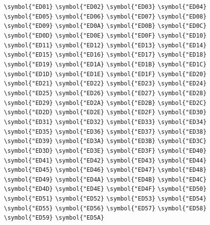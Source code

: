 \documentclass{ctexbook}
\begin{document}
{\verb|\symbol{"ED01}|  \verb|\symbol{"ED02}|  \verb|\symbol{"ED03}|  \verb|\symbol{"ED04}|  \verb|\symbol{"ED05}|  \verb|\symbol{"ED06}|  \verb|\symbol{"ED07}|  \verb|\symbol{"ED08}|  \verb|\symbol{"ED09}|  \verb|\symbol{"ED0A}|  \verb|\symbol{"ED0B}|  \verb|\symbol{"ED0C}|  \verb|\symbol{"ED0D}|  \verb|\symbol{"ED0E}|  \verb|\symbol{"ED0F}|  \verb|\symbol{"ED10}|  \verb|\symbol{"ED11}|  \verb|\symbol{"ED12}|  \verb|\symbol{"ED13}|  \verb|\symbol{"ED14}|  \verb|\symbol{"ED15}|  \verb|\symbol{"ED16}|  \verb|\symbol{"ED17}|  \verb|\symbol{"ED18}|  \verb|\symbol{"ED19}|  \verb|\symbol{"ED1A}|  \verb|\symbol{"ED1B}|  \verb|\symbol{"ED1C}|  \verb|\symbol{"ED1D}|  \verb|\symbol{"ED1E}|  \verb|\symbol{"ED1F}|  \verb|\symbol{"ED20}|  \verb|\symbol{"ED21}|  \verb|\symbol{"ED22}|  \verb|\symbol{"ED23}|  \verb|\symbol{"ED24}|  \verb|\symbol{"ED25}|  \verb|\symbol{"ED26}|  \verb|\symbol{"ED27}|  \verb|\symbol{"ED28}|  \verb|\symbol{"ED29}|  \verb|\symbol{"ED2A}|  \verb|\symbol{"ED2B}|  \verb|\symbol{"ED2C}|  \verb|\symbol{"ED2D}|  \verb|\symbol{"ED2E}|  \verb|\symbol{"ED2F}|  \verb|\symbol{"ED30}|  \verb|\symbol{"ED31}|  \verb|\symbol{"ED32}|  \verb|\symbol{"ED33}|  \verb|\symbol{"ED34}|  \verb|\symbol{"ED35}|  \verb|\symbol{"ED36}|  \verb|\symbol{"ED37}|  \verb|\symbol{"ED38}|  \verb|\symbol{"ED39}|  \verb|\symbol{"ED3A}|  \verb|\symbol{"ED3B}|  \verb|\symbol{"ED3C}|  \verb|\symbol{"ED3D}|  \verb|\symbol{"ED3E}|  \verb|\symbol{"ED3F}|  \verb|\symbol{"ED40}|  \verb|\symbol{"ED41}|  \verb|\symbol{"ED42}|  \verb|\symbol{"ED43}|  \verb|\symbol{"ED44}|  \verb|\symbol{"ED45}|  \verb|\symbol{"ED46}|  \verb|\symbol{"ED47}|  \verb|\symbol{"ED48}|  \verb|\symbol{"ED49}|  \verb|\symbol{"ED4A}|  \verb|\symbol{"ED4B}|  \verb|\symbol{"ED4C}|  \verb|\symbol{"ED4D}|  \verb|\symbol{"ED4E}|  \verb|\symbol{"ED4F}|  \verb|\symbol{"ED50}|  \verb|\symbol{"ED51}|  \verb|\symbol{"ED52}|  \verb|\symbol{"ED53}|  \verb|\symbol{"ED54}|  \verb|\symbol{"ED55}|  \verb|\symbol{"ED56}|  \verb|\symbol{"ED57}|  \verb|\symbol{"ED58}|  \verb|\symbol{"ED59}|  \verb|\symbol{"ED5A}|  }
\end{document}
